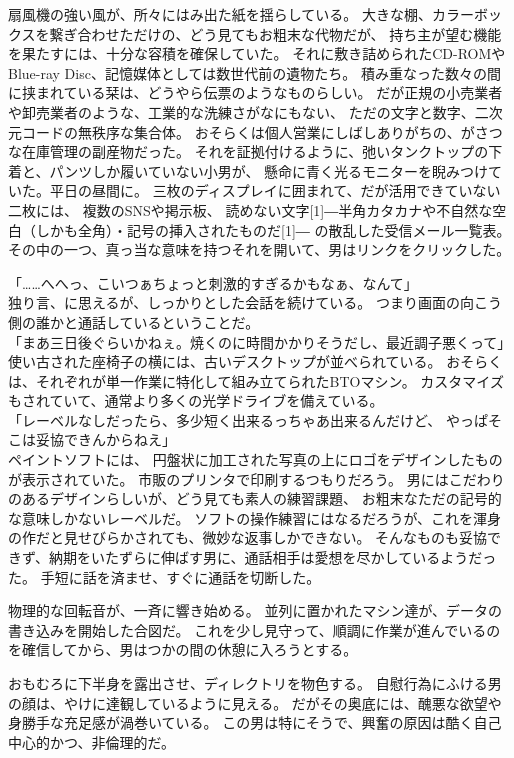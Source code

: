 \documentclass[../NenokuniMain]{subfiles}
\begin{document}
扇風機の強い風が、所々にはみ出た紙を揺らしている。
大きな棚、カラーボックスを繋ぎ合わせただけの、どう見てもお粗末な代物だが、
持ち主が望む機能を果たすには、十分な容積を確保していた。
それに敷き詰められたCD-ROMやBlue-ray Disc、記憶媒体としては数世代前の遺物たち。
積み重なった数々の間に挟まれている栞は、どうやら伝票のようなものらしい。
だが正規の小売業者や卸売業者のような、工業的な洗練さがなにもない、
ただの文字と数字、二次元コードの無秩序な集合体。
おそらくは個人営業にしばしありがちの、がさつな在庫管理の副産物だった。
それを証拠付けるように、弛いタンクトップの下着と、パンツしか履いていない小男が、
懸命に青く光るモニターを睨みつけていた。平日の昼間に。
三枚のディスプレイに囲まれて、だが活用できていない二枚には、
複数のSNSや掲示板、
読めない文字\scalebox{2}[1]{―}半角カタカナや不自然な空白（しかも全角）・記号の挿入されたものだ\scalebox{2}[1]{―}
の散乱した受信メール一覧表。
その中の一つ、真っ当な意味を持つそれを開いて、男はリンクをクリックした。

「……へへっ、こいつぁちょっと刺激的すぎるかもなぁ、なんて」\\
独り言、に思えるが、しっかりとした会話を続けている。
つまり画面の向こう側の誰かと通話しているということだ。\\
「まあ三日後ぐらいかねぇ。焼くのに時間かかりそうだし、最近調子悪くって」\\
使い古された座椅子の横には、古いデスクトップが並べられている。
おそらくは、それぞれが単一作業に特化して組み立てられたBTOマシン。
カスタマイズもされていて、通常より多くの光学ドライブを備えている。\\
「レーベルなしだったら、多少短く出来るっちゃあ出来るんだけど、
やっぱそこは妥協できんからねえ」\\
ペイントソフトには、
円盤状に加工された写真の上にロゴをデザインしたものが表示されていた。
市販のプリンタで印刷するつもりだろう。
男にはこだわりのあるデザインらしいが、どう見ても素人の練習課題、
お粗末なただの記号的な意味しかないレーベルだ。
ソフトの操作練習にはなるだろうが、これを渾身の作だと見せびらかされても、微妙な返事しかできない。
そんなものも妥協できず、納期をいたずらに伸ばす男に、通話相手は愛想を尽かしているようだった。
手短に話を済ませ、すぐに通話を切断した。

物理的な回転音が、一斉に響き始める。
並列に置かれたマシン達が、データの書き込みを開始した合図だ。
これを少し見守って、順調に作業が進んでいるのを確信してから、男はつかの間の休憩に入ろうとする。

おもむろに下半身を露出させ、ディレクトリを物色する。
自慰行為にふける男の顔は、やけに達観しているように見える。
だがその奥底には、醜悪な欲望や身勝手な充足感が渦巻いている。
この男は特にそうで、興奮の原因は酷く自己中心的かつ、非倫理的だ。
\end{document}
